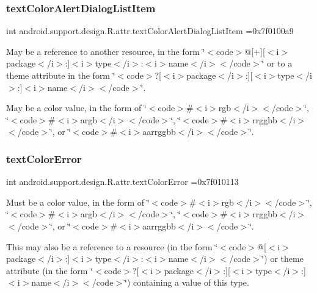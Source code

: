 \subsubsection{\texorpdfstring{text\+Color\+Alert\+Dialog\+List\+Item}{textColorAlertDialogListItem}}
{\footnotesize\ttfamily int android.\+support.\+design.\+R.\+attr.\+text\+Color\+Alert\+Dialog\+List\+Item =0x7f0100a9\hspace{0.3cm}{\ttfamily [static]}}

May be a reference to another resource, in the form \char`\"{}$<$code$>$@\mbox{[}+\mbox{]}\mbox{[}$<$i$>$package$<$/i$>$\+:\mbox{]}$<$i$>$type$<$/i$>$\+:$<$i$>$name$<$/i$>$$<$/code$>$\char`\"{} or to a theme attribute in the form \char`\"{}$<$code$>$?\mbox{[}$<$i$>$package$<$/i$>$\+:\mbox{]}\mbox{[}$<$i$>$type$<$/i$>$\+:\mbox{]}$<$i$>$name$<$/i$>$$<$/code$>$\char`\"{}. 

May be a color value, in the form of \char`\"{}$<$code$>$\#$<$i$>$rgb$<$/i$>$$<$/code$>$\char`\"{}, \char`\"{}$<$code$>$\#$<$i$>$argb$<$/i$>$$<$/code$>$\char`\"{}, \char`\"{}$<$code$>$\#$<$i$>$rrggbb$<$/i$>$$<$/code$>$\char`\"{}, or \char`\"{}$<$code$>$\#$<$i$>$aarrggbb$<$/i$>$$<$/code$>$\char`\"{}. \mbox{\label{classandroid_1_1support_1_1design_1_1R_1_1attr_afc583144784891897393a80c91d4911b}} 
\subsubsection{\texorpdfstring{text\+Color\+Error}{textColorError}}
{\footnotesize\ttfamily int android.\+support.\+design.\+R.\+attr.\+text\+Color\+Error =0x7f010113\hspace{0.3cm}{\ttfamily [static]}}

Must be a color value, in the form of \char`\"{}$<$code$>$\#$<$i$>$rgb$<$/i$>$$<$/code$>$\char`\"{}, \char`\"{}$<$code$>$\#$<$i$>$argb$<$/i$>$$<$/code$>$\char`\"{}, \char`\"{}$<$code$>$\#$<$i$>$rrggbb$<$/i$>$$<$/code$>$\char`\"{}, or \char`\"{}$<$code$>$\#$<$i$>$aarrggbb$<$/i$>$$<$/code$>$\char`\"{}. 

This may also be a reference to a resource (in the form \char`\"{}$<$code$>$@\mbox{[}$<$i$>$package$<$/i$>$\+:\mbox{]}$<$i$>$type$<$/i$>$\+:$<$i$>$name$<$/i$>$$<$/code$>$\char`\"{}) or theme attribute (in the form \char`\"{}$<$code$>$?\mbox{[}$<$i$>$package$<$/i$>$\+:\mbox{]}\mbox{[}$<$i$>$type$<$/i$>$\+:\mbox{]}$<$i$>$name$<$/i$>$$<$/code$>$\char`\"{}) containing a value of this type. \mbox{\label{classandroid_1_1support_1_1design_1_1R_1_1attr_aa08a69e2042fd2d19b2b7adaf1fcfc8a}} 

